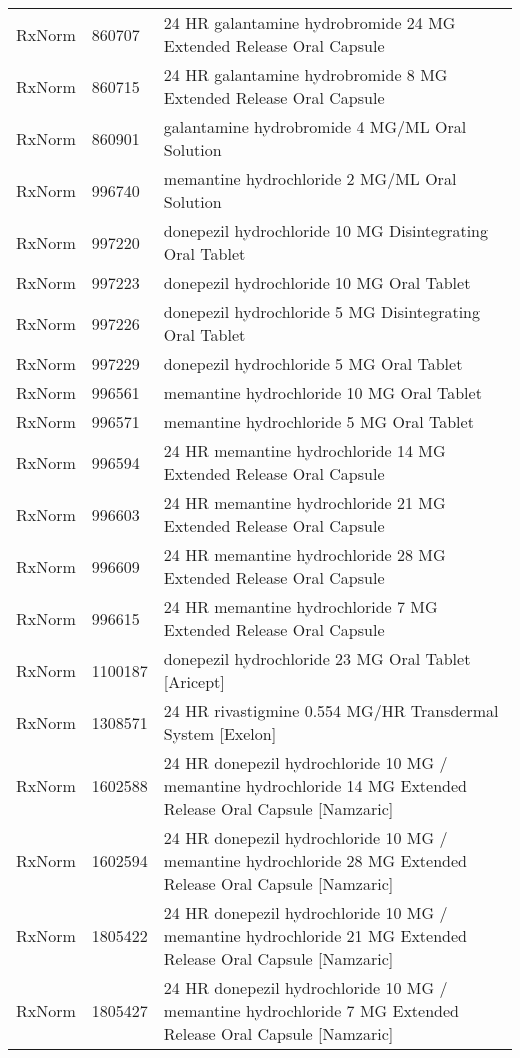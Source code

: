 \begin{longtable}{p{}p{}p{}}
  RxNorm & 860707 & 24 HR galantamine hydrobromide 24 MG Extended Release Oral Capsule \\ 
  RxNorm & 860715 & 24 HR galantamine hydrobromide 8 MG Extended Release Oral Capsule \\ 
  RxNorm & 860901 & galantamine hydrobromide 4 MG/ML Oral Solution \\ 
  RxNorm & 996740 & memantine hydrochloride 2 MG/ML Oral Solution \\ 
  RxNorm & 997220 & donepezil hydrochloride 10 MG Disintegrating Oral Tablet \\ 
  RxNorm & 997223 & donepezil hydrochloride 10 MG Oral Tablet \\ 
  RxNorm & 997226 & donepezil hydrochloride 5 MG Disintegrating Oral Tablet \\ 
  RxNorm & 997229 & donepezil hydrochloride 5 MG Oral Tablet \\ 
  RxNorm & 996561 & memantine hydrochloride 10 MG Oral Tablet \\ 
  RxNorm & 996571 & memantine hydrochloride 5 MG Oral Tablet \\ 
  RxNorm & 996594 & 24 HR memantine hydrochloride 14 MG Extended Release Oral Capsule \\ 
  RxNorm & 996603 & 24 HR memantine hydrochloride 21 MG Extended Release Oral Capsule \\ 
  RxNorm & 996609 & 24 HR memantine hydrochloride 28 MG Extended Release Oral Capsule \\ 
  RxNorm & 996615 & 24 HR memantine hydrochloride 7 MG Extended Release Oral Capsule \\ 
  RxNorm & 1100187 & donepezil hydrochloride 23 MG Oral Tablet [Aricept] \\ 
  RxNorm & 1308571 & 24 HR rivastigmine 0.554 MG/HR Transdermal System [Exelon] \\ 
  RxNorm & 1602588 & 24 HR donepezil hydrochloride 10 MG / memantine hydrochloride 14 MG Extended Release Oral Capsule [Namzaric] \\ 
  RxNorm & 1602594 & 24 HR donepezil hydrochloride 10 MG / memantine hydrochloride 28 MG Extended Release Oral Capsule [Namzaric] \\ 
  RxNorm & 1805422 & 24 HR donepezil hydrochloride 10 MG / memantine hydrochloride 21 MG Extended Release Oral Capsule [Namzaric] \\ 
  RxNorm & 1805427 & 24 HR donepezil hydrochloride 10 MG / memantine hydrochloride 7 MG Extended Release Oral Capsule [Namzaric] \\ 

\end{longtable}
